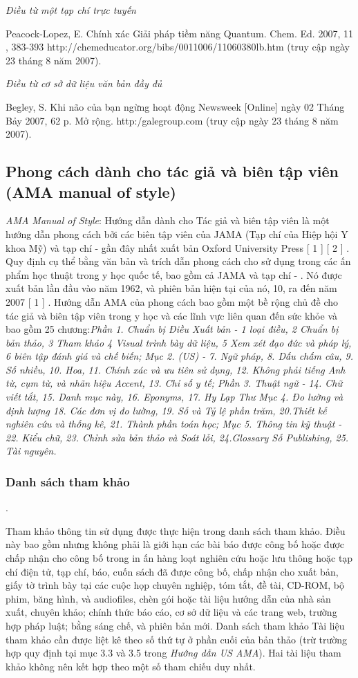 \documentclass{hcmutarticle}
\begin{document}
{\em Điều từ một tạp chí trực tuyến}

Peacock-Lopez, E. Chính xác Giải pháp tiềm năng Quantum. Chem. Ed. 2007, 11 , 383-393 http://chemeducator.org/bibs/0011006/11060380lb.htm (truy cập ngày 23 tháng 8 năm 2007).

{\em Điều từ cơ sở dữ liệu văn bản đầy đủ}

Begley, S. Khi não của bạn ngừng hoạt động Newsweek [Online] ngày 02 Tháng Bảy 2007, 62 p. Mở rộng. http:/galegroup.com (truy cập ngày 23 tháng 8 năm 2007).



\subsection{Phong cách dành cho tác giả và biên tập viên (AMA manual of style)}

{\em AMA Manual of Style}: Hướng dẫn dành cho Tác giả và biên tập viên là một hướng dẫn phong cách bởi các biên tập viên của JAMA (Tạp chí của Hiệp hội Y khoa Mỹ) và tạp chí - gần đây nhất xuất bản Oxford University Press [ 1 ] [ 2 ] . Quy định cụ thể bằng văn bản và trích dẫn phong cách cho sử dụng trong các ấn phẩm học thuật trong y học quốc tế, bao gồm cả JAMA và tạp chí - . Nó được xuất bản lần đầu vào năm 1962, và phiên bản hiện tại của nó, 10, ra đến năm 2007 [ 1 ] . Hướng dẫn AMA của phong cách bao gồm một bề rộng chủ đề cho tác giả và biên tập viên trong y học và các lĩnh vực liên quan đến sức khỏe và bao gồm 25 chương:{\em Phần 1. Chuẩn bị Điều Xuất bản - 1 loại điều, 2 Chuẩn bị bản thảo, 3 Tham khảo 4 Visual trình bày dữ liệu, 5 Xem xét đạo đức và pháp lý, 6 biên tập đánh giá và chế biến; Mục 2. (US) - 7. Ngữ pháp, 8. Dấu chấm câu, 9. Số nhiều, 10. Hoa, 11. Chính xác và ưu tiên sử dụng, 12. Không phải tiếng Anh từ, cụm từ, và nhãn hiệu Accent, 13. Chỉ số y tế; Phần 3. Thuật ngữ - 14. Chữ viết tắt, 15. Danh mục này, 16. Eponyms, 17. Hy Lạp Thư Mục 4. Đo lường và định lượng 18. Các đơn vị đo lường, 19. Số và Tỷ lệ phần trăm, 20.Thiết kế nghiên cứu và thống kê, 21. Thành phần toán học; Mục 5. Thông tin kỹ thuật - 22. Kiểu chữ, 23. Chỉnh sửa bản thảo và Soát lỗi, 24.Glossary Số Publishing, 25. Tài nguyên.}
\subsubsection{Danh sách tham khảo}.

Tham khảo thông tin sử dụng được thực hiện trong danh sách tham khảo. Điều này bao gồm nhưng không phải là giới hạn các bài báo được công bố hoặc được chấp nhận cho công bố trong in ấn hàng loạt nghiên cứu hoặc lưu thông hoặc tạp chí điện tử, tạp chí, báo, cuốn sách đã được công bố, chấp nhận cho xuất bản, giấy tờ trình bày tại các cuộc họp chuyên nghiệp, tóm tắt, đề tài, CD-ROM, bộ phim, băng hình, và audiofiles, chèn gói hoặc tài liệu hướng dẫn của nhà sản xuất, chuyên khảo; chính thức báo cáo, cơ sở dữ liệu và các trang web, trường hợp pháp luật; bằng sáng chế, và phiên bản mới. Danh sách tham khảo Tài liệu tham khảo cần được liệt kê theo số thứ tự ở phần cuối của bản thảo (trừ trường hợp quy định tại mục 3.3 và 3.5 trong {\itshape Hướng dẫn US AMA}). Hai tài liệu tham khảo không nên kết hợp theo một số tham chiếu duy nhất.
\end{document}
